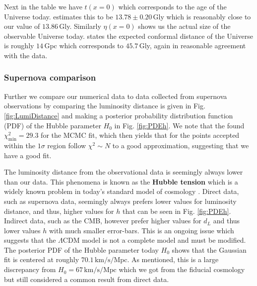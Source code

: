 \documentclass[%
reprint,
 amsmath,amssymb,
 aps,
]{revtex4-2}
\begin{document}
Next in the table we have $t(x=0)$ which corresponds to the age of the Universe today. \cite{Planck:2018vyg} estimates this to be $13.78\pm0.20\,$Gly which is reasonably close to our value of $13.86\,$Gly. Similarly $\eta(x=0)$ shows us the actual size of the observable Universe today. \cite{Gott:2003pf} states the expected conformal distance of the Universe is roughly $14\,$Gpc which corresponds to $45.7\,$Gly, again in reasonable agreement with the data. 
\subsubsection{Supernova comparison}
Further we compare our numerical data to data collected from supernova observations \cite{SDSS:2014iwm} by comparing the luminosity distance is given in Fig. \ref{fig:LumiDistance} and making a posterior probability distribution function (PDF) of the Hubble parameter $H_0$ in Fig. \ref{fig:PDEh}. We note that the found $\chi^2_\text{min}=29.3$ for the MCMC fit, which then yields that for the points accepted within the $1\sigma$ region follow $\chi^2\sim N$ to a good approximation, suggesting that we have a good fit. 

The luminosity distance from the observational data is seemingly always lower than our data. This phenomena is known as the \textbf{Hubble tension} which is a widely known problem in today's standard model of cosmology \cite{Di_Valentino_2021}. Direct data, such as supernova data, seemingly always prefers lower values for luminosity distance, and thus, higher values for $h$ that can be seen in Fig. \ref{fig:PDEh}. Indirect data, such as the CMB, however prefer higher values for $d_L$ and thus lower values $h$ with much smaller error-bars. This is an ongoing issue which suggests that the $\Lambda$CDM model is not a complete model and must be modified. The posterior PDF of the Hubble parameter today $H_0$ shows that the Gaussian fit is centered at roughly $70.1\,\text{km/s/Mpc}$. As mentioned, this is a large discrepancy from $H_0=67\,\text{km/s/Mpc}$ which we got from the fiducial cosmology but still considered a common result from direct data. 
\end{document}
